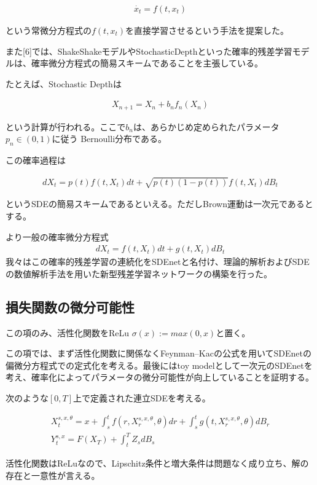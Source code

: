 \documentclass{jsarticle}
\begin{document}
\begin{align}
\dot{x_t}=f(t,x_t)
\end{align}

という常微分方程式の$f(t,x_t)$を直接学習させるという手法を提案した。

また[6]では、ShakeShakeモデルやStochasticDepthといった確率的残差学習モデルは、確率微分方程式の簡易スキームであることを主張している。

たとえば、Stochastic Depthは

\begin{align}
X_{n+1}=X_n+b_nf_n(X_n)
\end{align}

という計算が行われる。ここで$b_n$は、あらかじめ定められたパラメータ$p_n\in(0,1)$に従う Bernoulli分布である。

この確率過程は

\begin{align}
dX_t=p(t)f(t,X_t)dt+\sqrt{p(t)(1-p(t))}f(t,X_t)dB_t
\end{align}

というSDEの簡易スキームであるといえる。ただしBrown運動は一次元であるとする。

より一般の確率微分方程式
\begin{align}
dX_t=f(t,X_t)dt+g(t,X_t)dB_t
\end{align}
我々はこの確率的残差学習の連続化をSDEnetと名付け、理論的解析およびSDEの数値解析手法を用いた新型残差学習ネットワークの構築を行った。


\subsection{損失関数の微分可能性}
この項のみ、活性化関数をReLu $\sigma(x):=max(0,x)$と置く。

この項では、まず活性化関数に関係なくFeynman–Kacの公式を用いてSDEnetの偏微分方程式での定式化を考える。最後にはtoy modelとして一次元のSDEnetを考え、確率化によってパラメータの微分可能性が向上していることを証明する。

次のような$[0,T]$上で定義された連立SDEを考える。

\begin{align}
X^{s,x,\theta}_t=x+\int^t_sf(r,X^{s,x,\theta}_r,\theta)dr+\int^t_sg(t,X^{s,x,\theta}_r,\theta)dB_r\\
Y^{s,x}_t=F(X_T)+\int^T_t Z_s dB_s
\end{align}

活性化関数はReLuなので、Lipschitz条件と増大条件は問題なく成り立ち、解の存在と一意性が言える。
\end{document}
